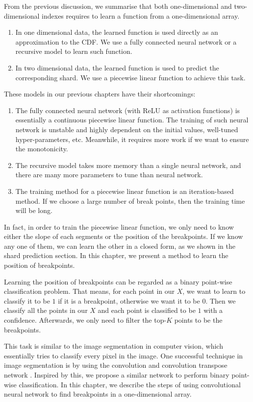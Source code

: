 From the previous discussion, we summarise that both one-dimensional and two-dimensional indexes requires to learn a function from a one-dimensional array. 
\begin{enumerate}
	\item In one dimensional data, the learned function is used directly as an approximation to the CDF. We use a fully connected neural network or a recursive model to learn such function.
	\item In two dimensional data, the learned function is used to predict the corresponding shard. We use a piecewise linear function to achieve this task.
\end{enumerate}

These models in our previous chapters have their shortcomings:

\begin{enumerate}
	\item The fully connected neural network (with ReLU as activation functions) is essentially a continuous piecewise linear function. The training of such neural network is unstable and highly dependent on the initial values, well-tuned hyper-parameters, etc. Meanwhile, it requires more work if we want to ensure the monotonicity.
	\item The recursive model takes more memory than a single neural network, and there are many more parameters to tune than neural network. 
	\item The training method for a piecewise linear function is an iteration-based method. If we choose a large number of break points, then the training time will be long.
\end{enumerate}

In fact, in order to train the piecewise linear function, we only need to know either the slope of each segments or the position of the breakpoints. If we know any one of them, we can learn the other in a closed form, as we shown in the shard prediction section. In this chapter, we present a method to learn the position of breakpoints.

Learning the position of breakpoints can be regarded as a binary point-wise classification problem. That means, for each point in our $X$, we want to learn to classify it to be $1$ if it is a breakpoint, otherwise we want it to be $0$. Then we classify all the points in our $X$ and each point is classified to be $1$ with a confidence. Afterwards, we only need to filter the top-$K$ points to be the breakpoints.

This task is similar to the image segmentation in computer vision, which essentially tries to classify every pixel in the image. One successful technique in image segmentation is by using the convolution and convolution transpose network \cite{long2015fully}. Inspired by this, we propose a similar network to perform binary point-wise classification. In this chapter, we describe the steps of using convolutional neural network to find breakpoints in a one-dimensional array.

